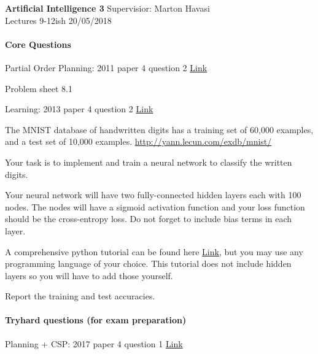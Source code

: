 \documentclass{exam}
\begin{document}
\noindent
\large\textbf{Artificial Intelligence 3} \hfill Supervisior: Marton Havasi \\
\normalsize Lectures 9-12ish \hfill 20/05/2018

\paragraph{Core Questions}
\begin{questions}

\question Partial Order Planning: 2011 paper 4 question 2 \href{http://www.cl.cam.ac.uk/teaching/exams/pastpapers/y2011p4q2.pdf}{Link}

\question Problem sheet 8.1 

\question Learning: 2013 paper 4 question 2 \href{http://www.cl.cam.ac.uk/teaching/exams/pastpapers/y2013p4q2.pdf}{Link} 

\question The MNIST database of handwritten digits has a training set of 60,000 examples, and a test set of 10,000 examples. \href{http://yann.lecun.com/exdb/mnist/}{http://yann.lecun.com/exdb/mnist/}

Your task is to implement and train a neural network to classify the written digits.

Your neural network will have two fully-connected hidden layers each with 100 nodes. The nodes will have a sigmoid activation function and your loss function should be the cross-entropy loss. Do not forget to include bias terms in each layer.

A comprehensive python tutorial can be found here \href{https://www.tensorflow.org/versions/r1.0/get_started/mnist/beginners}{Link}, but you may use any programming language of your choice. This tutorial does not include hidden layers so you will have to add those yourself.

Report the training and test accuracies.
\end{questions}

\paragraph{Tryhard questions (for exam preparation)}
\begin{questions}
\question Planning + CSP: 2017 paper 4 question 1 \href{http://www.cl.cam.ac.uk/teaching/exams/pastpapers/y2017p4q1.pdf}{Link} 

\end{questions}
\end{document}
